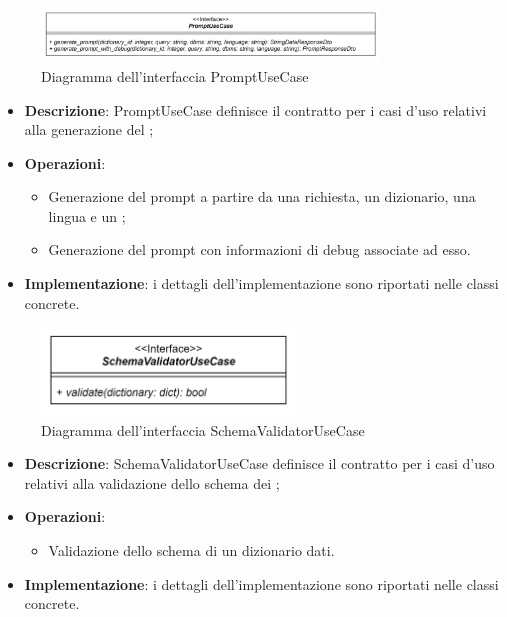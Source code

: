  \label{PromptUseCase}
\begin{figure}[H]
    \centering
    \includegraphics[width=0.8\textwidth]{assets/Backend/prompt_use_case.png}
    \caption{Diagramma dell'interfaccia PromptUseCase}
  \end{figure}
\begin{itemize}
    \item \textbf{Descrizione}: PromptUseCase definisce il contratto per i casi d'uso relativi alla generazione del ;
    \item \textbf{Operazioni}:
    \begin{itemize}
      \item Generazione del prompt a partire da una richiesta, un dizionario, una lingua e un ;
      \item Generazione del prompt con informazioni di debug associate ad esso.
    \end{itemize}
    \item \textbf{Implementazione}: i dettagli dell'implementazione sono riportati nelle classi concrete.
\end{itemize}  

 \label{SchemaValidatorUseCase}
\begin{figure}[H]
    \centering
    \includegraphics[width=0.6\textwidth]{assets/Backend/schema_validator_use_case.png}
    \caption{Diagramma dell'interfaccia SchemaValidatorUseCase}
  \end{figure}
\begin{itemize}
    \item \textbf{Descrizione}: SchemaValidatorUseCase definisce il contratto per i casi d'uso relativi alla validazione dello schema dei ;
    \item \textbf{Operazioni}:
    \begin{itemize}
      \item Validazione dello schema di un dizionario dati.
    \end{itemize}
    \item \textbf{Implementazione}: i dettagli dell'implementazione sono riportati nelle classi concrete.
\end{itemize}  

